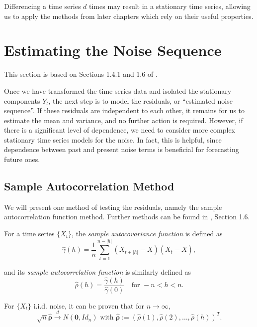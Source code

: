 \documentclass[a4paper, oneside]{discothesis}
\begin{document}
Differencing a time series $d$ times may result in a stationary time series, allowing us to apply the methods from later chapters which rely on their useful properties.

\section{Estimating the Noise Sequence}\label{sc:noise}

This section is based on Sections 1.4.1 and 1.6 of \cite{itsf}.

Once we have transformed the time series data and isolated the stationary components $Y_t$, the next step is to model the residuals, or “estimated noise sequence”. If these residuals are independent to each other, it remains for us to estimate the mean and variance, and no further action is required. However, if there is a significant level of dependence, we need to consider more complex stationary time series models for the noise. In fact, this is helpful, since dependence between past and present noise terms is beneficial for forecasting future ones.

\subsection{Sample Autocorrelation Method}
We will present one method of testing the residuals, namely the sample autocorrelation function method. Further methods can be found in \cite{itsf}, Section 1.6.

\begin{definition}
    For a time series $\{X_t\}$, the \textit{sample autocovariance function} is defined as
    \begin{equation*}
        \hat{\gamma}(h) = \frac{1}{n} \sum^{n-|h|}_{t=1} (X_{t+|h|} - \bar{X})(X_t - \bar{X}),
    \end{equation*}
    
    and its \textit{sample autocorrelation function} is similarly defined as
    \begin{equation*}
        \hat{\rho}(h) = \frac{\hat{\gamma}(h)}{\hat{\gamma}(0)} \quad \text{for } -n < h < n.
    \end{equation*}
\end{definition}

For $\{X_t\}$ i.i.d. noise, it can be proven that for $n \to \infty$,
\begin{equation*}
    \sqrt{n} \boldsymbol{\hat{\rho}} \xrightarrow{d} N(\mathbf{0}, Id_n) \text{ with } \boldsymbol{\hat{\rho}} := (\hat{\rho}(1), \hat{\rho}(2), \dots, \hat{\rho}(h))^T.
\end{equation*}
\end{document}

